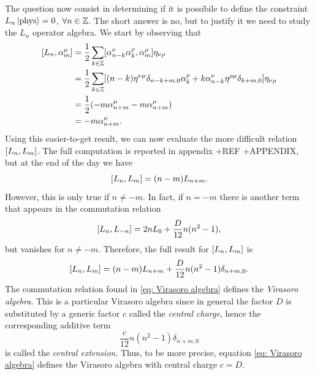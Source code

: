 The question now consist in determining if it is possibile to define the constraint $L_n\ket{\mathrm{phys}} = 0$, $\forall n \in \mathbb{Z}$. The short answer is no, but to justify it we need to study the $L_n$ operator algebra. We start by observing that 
\begin{equation}
    \begin{split}
        [L_n,\alpha^\mu_m] &= \frac{1}{2}\sum_{k\in\mathbb{Z}}[\alpha^\nu_{n - k}\alpha^\rho_k,\alpha^\mu_m]\eta_{\nu\rho} \\
        &= \frac{1}{2}\sum_{k\in\mathbb{Z}}[(n - k)\eta^{\nu\mu}\delta_{n - k + m,0}\alpha^\rho_k + k\alpha^\nu_{n - k}\eta^{\rho\mu}\delta_{k + m,0}]\eta_{\nu\rho} \\
        &= \frac{1}{2}(-m\alpha^\mu_{n + m} - m\alpha^\mu_{n + m}) \\
        &= -m\alpha^\mu_{n+m}.
    \end{split}
\end{equation}
Using this easier-to-get result, we can now evaluate the more difficult relation $[L_n,L_m]$. The full computation is reported in appendix +REF +APPENDIX, but at the end of the day we have 
\begin{equation}
    [L_n,L_m] = (n - m)L_{n + m}.
\end{equation}
However, this is only true if $n \neq -m$. In fact, if $n = -m$ there is another term that appears in the commutation relation
\begin{equation}
    [L_n,L_{-n}] = 2nL_0 + \frac{D}{12}n(n^2 - 1),
\end{equation}
but vanishes for $n \neq -m$. Therefore, the full result for $[L_n,L_m]$ is 
\begin{equation}
\label{eq: Virasoro algebra}
    [L_n,L_m] = (n - m)L_{n + m} + \frac{D}{12}n(n^2 - 1)\delta_{n + m,0}.
\end{equation}
The commutation relation found in \eqref{eq: Virasoro algebra} defines the \emph{Virasoro algebra}. This is a particular Virasoro algebra since in general the factor $D$ is substituted by a generic factor $c$ called the \emph{central charge}, hence the corresponding additive term  
\begin{equation}
    \frac{c}{12}n(n^2 - 1)\delta_{n + m,0}
\end{equation}
is called the \emph{central extension}. Thus, to be more precise, equation \eqref{eq: Virasoro algebra} defines the Virasoro algebra with central charge $c = D$. 
